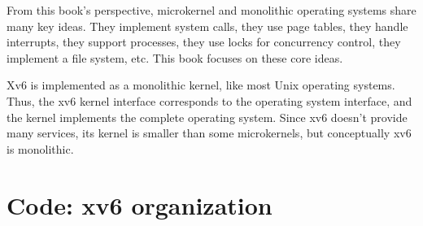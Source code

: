 From this book's perspective, microkernel and monolithic operating
systems share many key ideas.  They implement system calls, they use
page tables, they handle interrupts, they support processes, they use
locks for concurrency control, they implement a file system,
etc. This book focuses on these core ideas.

Xv6 is
implemented as a monolithic kernel, like most Unix operating systems.
Thus, the xv6 kernel interface corresponds to the operating system
interface, and the kernel implements the complete operating system.  Since 
xv6 doesn't provide many services, its kernel is smaller than some
microkernels, but conceptually xv6 is monolithic.  

\section{Code: xv6 organization}

